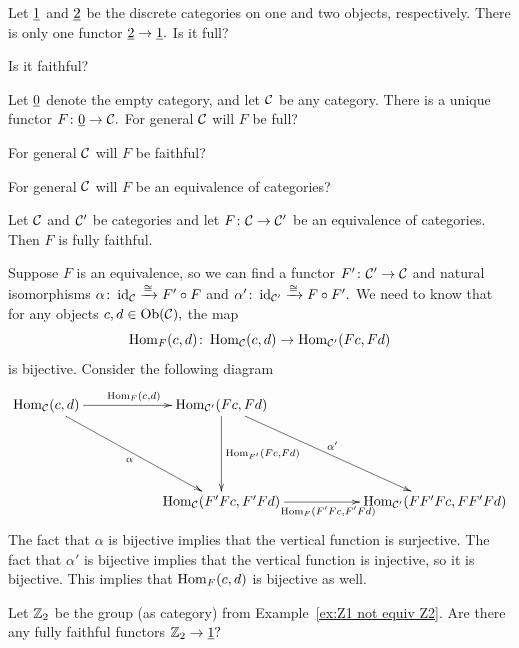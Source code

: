 \documentclass[../main/CT4S-EN-RU]{subfiles}
\begin{document}
\begin{definitionRUS}\label{def:full faithful}
\end{definitionRUS}

\begin{exerciseENG}
Let $\underline{1}$ and $\underline{2}$ be the discrete categories on one and two objects, respectively. There is only one functor $\underline{2}\rightarrow\underline{1}.$
\sexc Is it full?
\item Is it faithful?
\endsexc
\end{exerciseENG}

\begin{exerciseRUS}
\end{exerciseRUS}

\begin{exerciseENG}\label{exc:empty fully faithful}
Let $\underline{0}$ denote the empty category, and let $\mathcal{C}$ be any category. There is a unique functor $F\colon \underline{0}\rightarrow\mathcal{C}.$
\sexc For general $\mathcal{C}$ will $F$ be full?
\item For general $\mathcal{C}$ will $F$ be faithful?
\item For general $\mathcal{C}$ will $F$ be an equivalence of categories?
\endsexc
\end{exerciseENG}

\begin{exerciseRUS}\label{exc:empty fully faithful}
\end{exerciseRUS}

\begin{propositionENG}
Let $\mathcal{C}$ and $\mathcal{C}'$ be categories and let $F\colon\mathcal{C}\rightarrow\mathcal{C}'$ be an equivalence of categories. Then $F$ is fully faithful.
\end{propositionENG}

\begin{propositionRUS}
\end{propositionRUS}

\begin{proofENG}
Suppose $F$ is an equivalence, so we can find a functor $F'\colon\mathcal{C}'\rightarrow\mathcal{C}$ and natural isomorphisms $\alpha\colon\operatorname{id}_\mathcal{C}\xrightarrow{\cong}F'\circ F$ and $\alpha'\colon\operatorname{id}_{\mathcal{C}'}\xrightarrow{\cong} F\circ F'.$ We need to know that for any objects $c,d\in\operatorname{Ob}(\mathcal{C}),$ the map $$\operatorname{Hom}_F(c,d)\colon\operatorname{Hom}_\mathcal{C}(c,d)\rightarrow\operatorname{Hom}_{\mathcal{C}'}(Fc,Fd)$$ is bijective. Consider the following diagram 
$$
\xymatrix{
\Hom_\mcC(c,d)\ar[rr]^{\Hom_F(c,d)}\ar[ddrr]_\alpha&&\Hom_{\mcC'}(Fc,Fd)\ar[ddrr]^{\alpha'}\ar[dd]^{\Hom_{F'}(Fc,Fd)}\\\\
&&\Hom_\mcC(F'Fc,F'Fd)\ar[rr]_{\Hom_{F}(F'Fc,F'Fd)}&&\Hom_{\mcC'}(FF'Fc,FF'Fd)
}
$$
The fact that $\alpha$ is bijective implies that the vertical function is surjective. The fact that $\alpha'$ is bijective implies that the vertical function is injective, so it is bijective. This implies that $\operatorname{Hom}_F(c,d)$ is bijective as well.
\end{proofENG}

\begin{proofRUS}
\end{proofRUS}

\begin{exerciseENG}
Let ${\mathbb Z}_2$ be the group (as category) from Example~\ref{ex:Z1 not equiv Z2}. Are there any fully faithful functors ${\mathbb Z}_2\rightarrow\underline{1}?$
\end{exerciseENG}

\begin{exerciseRUS}
\end{exerciseRUS}
\end{document}
